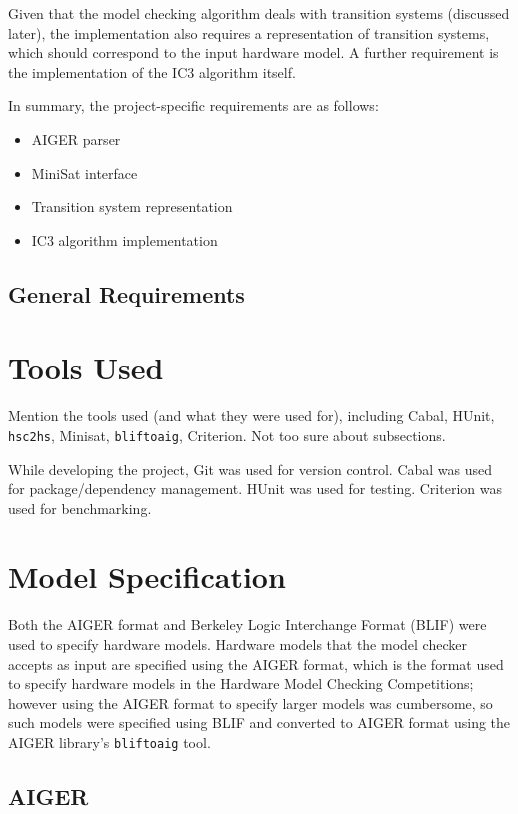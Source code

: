 \documentclass[12pt,a4paper,twoside,openright]{report}
\begin{document}
Given that the model checking algorithm deals with transition systems (discussed later),
the implementation also requires a representation of transition systems, which should
correspond to the input hardware model. A further requirement is the implementation of the
IC3 algorithm itself.

In summary, the project-specific requirements are as follows:
\begin{itemize}
\item AIGER parser
\item MiniSat interface
\item Transition system representation
\item IC3 algorithm implementation
\end{itemize}

\subsection{General Requirements}

\section{Tools Used}
Mention the tools used (and what they were used for), including Cabal,
HUnit, {\tt hsc2hs}, Minisat, {\tt bliftoaig}, Criterion.
Not too sure about subsections.

While developing the project, Git was used for version control.
Cabal was used for package/dependency management.
HUnit was used for testing.
Criterion was used for benchmarking.

\section{Model Specification}

Both the AIGER format and Berkeley Logic Interchange Format (BLIF) were used to specify
hardware models.
Hardware models that the model checker accepts as input
are specified using the AIGER format, which is the format used to specify
hardware models in the Hardware Model Checking Competitions; however using the
AIGER format to specify larger models was cumbersome, so such models were specified
using BLIF and converted to AIGER format using the AIGER library's \verb,bliftoaig, tool.

\subsection{AIGER}
\end{document}
